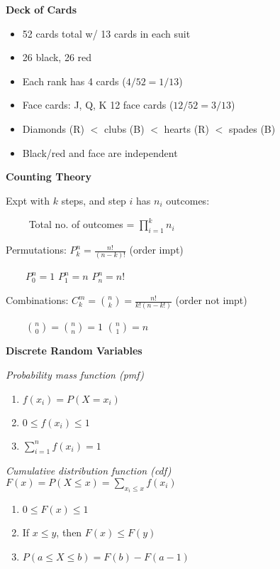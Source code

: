 \documentclass[twocolumn]{article}
\begin{document}
\textbf{Deck of Cards}
\vspace{-.5em}
\begin{itemize}
    \item 52 cards total w/ 13 cards in each suit
    \item 26 black, 26 red
    \item Each rank has 4 cards ($4/52=1/13$)
    \item Face cards: J, Q, K \hfill 12 face cards ($12/52=3/13$)
    \item Diamonds (R) $<$ clubs (B) $<$ hearts (R) $<$ spades (B)
    \item Black/red and face are independent
\end{itemize}


\newpage


\textbf{Counting Theory}

Expt with $k$ steps, and step $i$ has $n_i$ outcomes:

\vspace{-.5em} $\quad\quad$ Total no. of outcomes = $\prod_{i=1}^k n_i$ \vspace{-.5em}

Permutations: $P_k^n = \frac{n!}{(n-k)!}$ \hfill (order impt)

\vspace{-.5em} $\quad\quad P_0^n = 1$ \hfill $P_1^n = n$ \hfill $P_n^n = n!$ \vspace{-.5em}

Combinations: $C_k^m = {n \choose k} = \frac{n!}{k! (n-k!)}$ \hfill (order not impt) \vspace{-1em}

$\quad\quad {n \choose 0} = {n \choose n} = 1$ \hfill ${n \choose 1} = n$

\dotfill

\textbf{Discrete Random Variables}

\textit{Probability mass function (pmf)} \vspace{-.5em}
\begin{enumerate}
    \item $f(x_i) = P(X = x_i)$
    \item $0 \leq f(x_i) \leq 1$
    \item $ \sum_{i=1}^n f(x_i) = 1$
\end{enumerate}

\textit{Cumulative distribution function (cdf)} \\[.5em]
$F(x) = P(X \leq x) = \sum_{x_i \leq x} f(x_i)$
\vspace{-1.5em}
\begin{enumerate}
    \item $0 \leq F(x) \leq 1$
    \item If $x \leq y$, then $F(x) \leq F(y)$
    \item $P(a \leq X \leq b) = F(b) - F(a-1)$
\end{enumerate}
\end{document}
